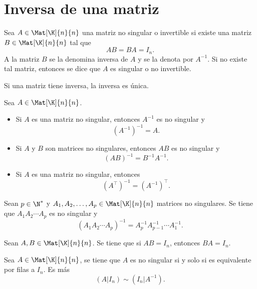 \documentclass[a4,11pt]{aleph-notas}
\begin{document}
\encabezado

\section{Inversa de una matriz}

\begin{defi}
    Sea $A\in \Mat[\K]{n}{n}$ una matriz no singular o invertible si existe una matriz $B\in \Mat[\K]{n}{n}$ tal que 
    \[
        AB = BA = I_n.
    \]
    A la matriz $B$ se la denomina inversa de $A$ y se la denota por $A^{-1}$. Si no existe tal matriz, entonces se dice que $A$ es singular o no invertible. 
\end{defi}

\begin{teo}
    Si una matriz tiene inversa, la inversa es única. 
\end{teo}

\begin{teo}
    Sea $A\in \Mat[\K]{n}{n}$. 
    \begin{itemize}
    \item 
        Si $A$ es una matriz no singular, entonces $A^{-1}$ es no singular y 
        \[ 
            (A^{-1})^{-1} = A.
        \]
    \item 
        Si $A$ y $B$ son matrices no singulares, entonces $AB$ es no singular y 
        \[ 
            (AB)^{-1} = B^{-1}A^{-1}.
        \]
    \item 
        Si $A$ es una matriz no singular, entonces
        \[
            {(A^\intercal)}^{-1} = {(A^{-1})}^\intercal.
        \]
    \end{itemize}
\end{teo}

\begin{teo}
    Sean $p\in\N^*$ y $A_1, A_2, \ldots, A_p \in \Mat[\K]{n}{n}$ matrices no singulares. Se tiene que $A_1 A_2 \cdots A_p$ es no singular y 
    \[
        (A_1 A_2 \cdots A_p)^{-1} = A_p^{-1} A_{p-1}^{-1} \cdots A_1^{-1}.
    \]
\end{teo}

\begin{teo}
    Sean $A, B \in \Mat[\K]{n}{n}$. Se tiene que si $AB=I_n$, entonces $BA=I_n$.
\end{teo}

\begin{teo}
    Sea $A \in \Mat[\K]{n}{n}$, se tiene que $A$ es no singular si y solo si es equivalente por filas a $I_n$. Es más
    \[
        (A|I_n) \sim (I_n|A^{-1}).
    \]
\end{teo}
\end{document}
